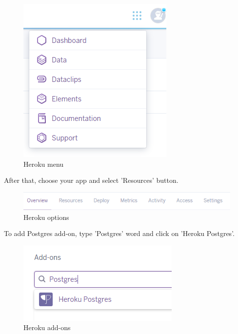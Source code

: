 \documentclass[12pt,a4paper]{article}
\begin{document}
\begin{figure}[H]
\centering
\includegraphics{images/dashboard.PNG}
\caption{Heroku menu}
\label{fig:menu}
\end{figure}
After that, choose your app and select 'Resources' button.
\begin{figure}[H]
	\centering
	\includegraphics{images/nav.PNG}
	\caption{Heroku options}
	\label{fig:nav}
\end{figure}


To add Postgres add-on, type 'Postgres' word and click on 'Heroku Postgres'. 
\begin{figure}[H]
	\centering
	\includegraphics{images/addon.PNG}
	\caption{Heroku add-ons}
	\label{fig:addon}
\end{figure}
\end{document}
